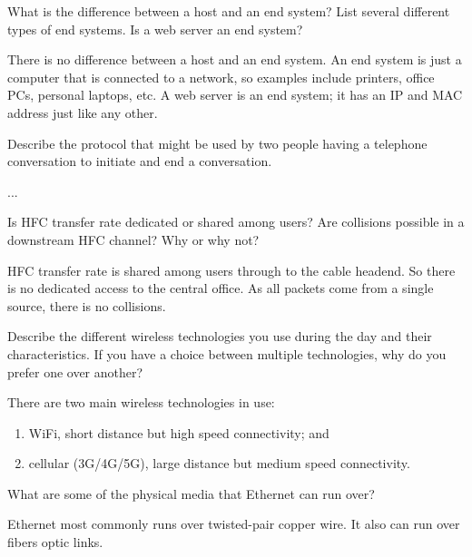 
\question What is the difference between a host and an end system? List several different types of end systems. Is a web server an end system?

\begin{solution}
    There is no difference between a host and an end system. An end system is just a computer that is connected to a network, so examples include printers, office PCs, personal laptops, etc. A web server is an end system; it has an IP and MAC address just like any other.
\end{solution}


\question Describe the protocol that might be used by two people having a telephone conversation to initiate and end a conversation.

\begin{solution}
   ... 
\end{solution}


\question Is HFC transfer rate dedicated or shared among users? Are collisions possible in a downstream HFC channel? Why or why not?

\begin{solution}
    HFC transfer rate is shared among users through to the cable headend. So there is no dedicated access to the central office. As all packets come from a single source, there is no collisions.   
\end{solution}


\question Describe the different wireless technologies you use during the day and their characteristics. If you have a choice between multiple technologies, why do you prefer one over another?

\begin{solution}
    There are two main wireless technologies in use:
    \begin{enumerate}
        \item WiFi, short distance but high speed connectivity; and
        \item cellular (3G/4G/5G), large distance but medium speed connectivity.
    \end{enumerate}
\end{solution}


\question What are some of the physical media that Ethernet can run over?

\begin{solution}
    Ethernet most commonly runs over twisted-pair copper wire. It also can run over fibers optic links.
\end{solution}


